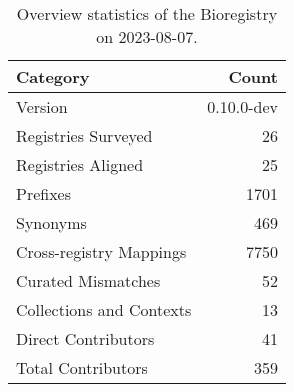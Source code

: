 \begin{table}
\caption{Overview statistics of the Bioregistry on 2023-08-07.}
\label{tab:bioregistry-summary}
\begin{tabular}{lr}
\toprule
Category & Count \\
\midrule
Version & 0.10.0-dev \\
Registries Surveyed & 26 \\
Registries Aligned & 25 \\
Prefixes & 1701 \\
Synonyms & 469 \\
Cross-registry Mappings & 7750 \\
Curated Mismatches & 52 \\
Collections and Contexts & 13 \\
Direct Contributors & 41 \\
Total Contributors & 359 \\
\bottomrule
\end{tabular}
\end{table}
